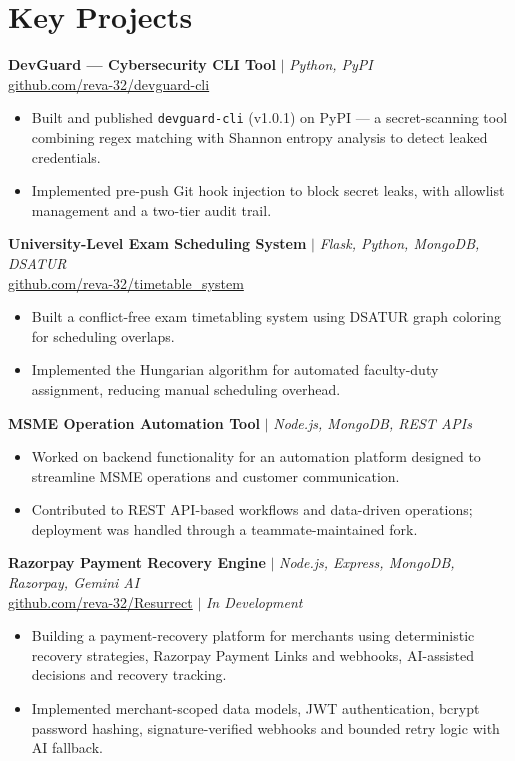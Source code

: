 \documentclass[11pt,a4paper]{article}
\begin{document}
\section*{Key Projects}
\textbf{DevGuard — Cybersecurity CLI Tool} $|$ \textit{Python, PyPI} \\
\small\href{https://github.com/reva-32/devguard-cli}{github.com/reva-32/devguard-cli}\normalsize
\begin{itemize}
    \item Built and published \texttt{devguard-cli} (v1.0.1) on PyPI — a secret-scanning tool combining regex matching with Shannon entropy analysis to detect leaked credentials.
    \item Implemented pre-push Git hook injection to block secret leaks, with allowlist management and a two-tier audit trail.
\end{itemize}
\textbf{University-Level Exam Scheduling System} $|$ \textit{Flask, Python, MongoDB, DSATUR} \\
\small\href{https://github.com/reva-32/timetable_system}{github.com/reva-32/timetable_system}\normalsize
\begin{itemize}
    \item Built a conflict-free exam timetabling system using DSATUR graph coloring for scheduling overlaps.
    \item Implemented the Hungarian algorithm for automated faculty-duty assignment, reducing manual scheduling overhead.
\end{itemize}
\textbf{MSME Operation Automation Tool} $|$ \textit{Node.js, MongoDB, REST APIs} \\
\begin{itemize}
    \item Worked on backend functionality for an automation platform designed to streamline MSME operations and customer communication.
    \item Contributed to REST API-based workflows and data-driven operations; deployment was handled through a teammate-maintained fork.
\end{itemize}
\textbf{Razorpay Payment Recovery Engine} $|$ \textit{Node.js, Express, MongoDB, Razorpay, Gemini AI} \\
\small\href{https://github.com/reva-32/Resurrect}{github.com/reva-32/Resurrect} $|$ \textit{In Development}\normalsize
\begin{itemize}
    \item Building a payment-recovery platform for merchants using deterministic recovery strategies, Razorpay Payment Links and webhooks, AI-assisted decisions and recovery tracking.
    \item Implemented merchant-scoped data models, JWT authentication, bcrypt password hashing, signature-verified webhooks and bounded retry logic with AI fallback.
\end{itemize}
\end{document}
